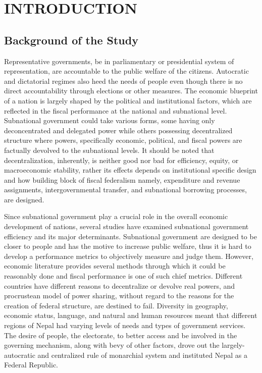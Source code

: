 \newpage
{}
\section{INTRODUCTION} 
\subsection{Background of the Study}
Representative governments, be in parliamentary or presidential system of representation, are accountable to the public welfare of the citizens. Autocratic and dictatorial regimes also heed the needs of people even though there is no direct accountability\cite{Gilli2014} through elections or other measures. The economic blueprint of a nation is largely shaped by the political and institutional factors, which are reflected in the fiscal performance at the national and subnational level\cite{Rattso1998, Dafflon2002}. Subnational government could take various forms, some having only deconcentrated and delegated power while others possessing decentralized structure where powers, specifically economic, political, and fiscal powers are factually devolved to the subnational levels. It should be noted that decentralization, inherently, is neither good nor bad for efficiency, equity, or macroeconomic stability, rather its effects depends on institutional specific design and how building block of fiscal federalism namely, expenditure and revenue assignments, intergovernmental transfer, and subnational borrowing processes, are designed\cite{Alt1994}. \par
Since subnational government play a crucial role in the overall economic development of nations, several studies have examined subnational government efficiency and its major determinants\cite{Deborger1994, Worthington2000, Geys2006, Bruns2008}. Subnational government are designed to be closer to people and has the motive to increase public welfare, thus it is hard to develop a performance metrics to objectively measure and judge them\cite{Gray2006}. However, economic literature provides several methods through which it could be reasonably done and fiscal performance is one of such chief metrics. Different countries have different reasons to decentralize or devolve real powers, and procrustean model of power sharing, without regard to the reasons for the creation of federal structure, are destined to fail. Diversity in geography, economic status, language, and natural and human resources meant that different regions of Nepal had varying levels of needs and types of government services. The desire of people, the electorate, to better access and be involved in the governing mechanism, along with bevy of other factors,  drove out the largely-autocratic and centralized rule of monarchial system and instituted Nepal as a Federal Republic.\par
